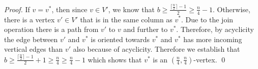 \documentclass[runningheads,a4paper]{llncs}
\newcommand{\MM}[1]{\marginpar{\parbox{3.6cm}{{\small {\bf MM:} #1}}}} %
\newcommand{\join}{\mbox{join}\xspace}
\begin{document}
\begin{proof}
If $v = v^*$, then since $v\in V'$, we know that $b\geq \frac{\lceil \frac{n}{2}\rceil-1}{2}\geq \frac{n}{4} - 1$.
Otherwise, there is a vertex $v' \in V'$ that is in the same column as $v^*$. Due to the \join operation there is a path from $v'$ to $v$ and further to $v^*$. Therefore, by acyclicity the edge between $v'$ and $v^*$ is oriented towards $v^*$ and $v^*$ has more incoming vertical edges than $v'$ also because of acyclicity. Therefore we establish that $b \geq \frac{\lceil \frac{n}{2}\rceil-1}{2} + 1 \geq \frac{n}{4} \geq \frac{n}{4} - 1$ which shows that $v^*$ is an $(\frac{n}{4}, \frac{n}{4})$-vertex. \qed


   
\end{proof}
\end{document}
